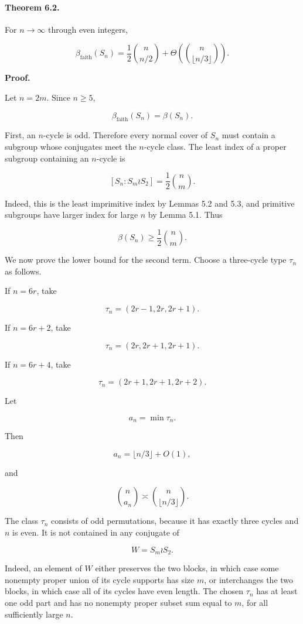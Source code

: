 \documentclass[11pt]{article}
\begin{document}
\paragraph{Theorem 6.2.}

For $n\to\infty$ through even integers,

\[
\beta_{\mathrm{faith}}(S_n)
=
\frac12\binom n{n/2}
+
\Theta\!\left(\binom n{\lfloor n/3\rfloor}\right).
\]

\noindent\textbf{Proof.}

Let $n=2m$. Since $n\ge5$,

\[
\beta_{\mathrm{faith}}(S_n)=\beta(S_n).
\]

First, an $n$-cycle is odd. Therefore every normal cover of $S_n$ must contain a subgroup whose conjugates meet the $n$-cycle class. The least index of a proper subgroup containing an $n$-cycle is

\[
[S_n:S_m\wr S_2]=\frac12\binom nm.
\]

Indeed, this is the least imprimitive index by Lemmas 5.2 and 5.3, and primitive subgroups have larger index for large $n$ by Lemma 5.1. Thus

\[
\beta(S_n)\ge \frac12\binom nm.
\]

We now prove the lower bound for the second term. Choose a three-cycle type $\tau_n$ as follows.

If $n=6r$, take

\[
\tau_n=(2r-1,2r,2r+1).
\]

If $n=6r+2$, take

\[
\tau_n=(2r,2r+1,2r+1).
\]

If $n=6r+4$, take

\[
\tau_n=(2r+1,2r+1,2r+2).
\]

Let

\[
a_n=\min\tau_n.
\]

Then

\[
a_n=\lfloor n/3\rfloor+O(1),
\]

and

\[
\binom n{a_n}\asymp \binom n{\lfloor n/3\rfloor}.
\]

The class $\tau_n$ consists of odd permutations, because it has exactly three cycles and $n$ is even. It is not contained in any conjugate of

\[
W=S_m\wr S_2.
\]

Indeed, an element of $W$ either preserves the two blocks, in which case some nonempty proper union of its cycle supports has size $m$, or interchanges the two blocks, in which case all of its cycles have even length. The chosen $\tau_n$ has at least one odd part and has no nonempty proper subset sum equal to $m$, for all sufficiently large $n$.
\end{document}
